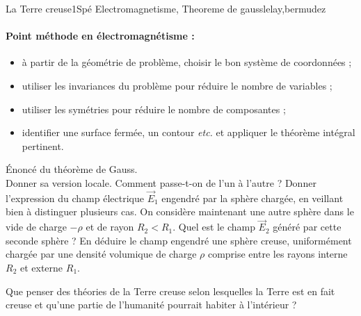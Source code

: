 \begin{exercise}{La Terre creuse}{1}{Spé}
{Electromagnetisme, Theoreme de gauss}{lelay,bermudez}

\paragraph{Point méthode en électromagnétisme :}
\begin{itemize}
    \item à partir de la géométrie de problème, choisir le bon système de coordonnées ;
    \item utiliser les invariances du problème pour réduire le nombre de variables ;
    \item utiliser les symétries pour réduire le nombre de composantes ;
    \item identifier une surface fermée, un contour \emph{etc.} et appliquer le théorème intégral pertinent.
\end{itemize}

\begin{questions}
    \questioncours Énoncé du théorème de Gauss. \\
    Donner sa version locale. Comment passe-t-on de l'un à l'autre ?
    \question Donner l'expression du champ électrique $\vec{E}_1$  engendré par la sphère chargée, en veillant bien à distinguer plusieurs cas.
    \question On considère maintenant une autre sphère dans le vide de charge $-\rho$ et de rayon $R_2 < R_1$. Quel est le champ $\vec{E}_2$ généré par cette seconde sphère ?
    \question En déduire le champ engendré une sphère creuse, uniformément chargée par une densité volumique de charge $\rho$ comprise entre les rayons interne $R_2$ et externe $R_1$.
	 
		  
		  
		  
	  
    \question Que penser des théories de la Terre creuse selon lesquelles la Terre est en fait creuse et qu'une partie de l'humanité pourrait habiter à l'intérieur ?
\end{questions}

\end{exercise}
